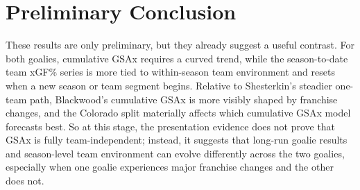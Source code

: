\documentclass[
  10pt,
]{extarticle}
\begin{document}
\section{Preliminary Conclusion}\label{preliminary-conclusion}

These results are only preliminary, but they already suggest a useful contrast. For both goalies, cumulative GSAx requires a curved trend, while the season-to-date team xGF\% series is more tied to within-season team environment and resets when a new season or team segment begins. Relative to Shesterkin's steadier one-team path, Blackwood's cumulative GSAx is more visibly shaped by franchise changes, and the Colorado split materially affects which cumulative GSAx model forecasts best. So at this stage, the presentation evidence does not prove that GSAx is fully team-independent; instead, it suggests that long-run goalie results and season-level team environment can evolve differently across the two goalies, especially when one goalie experiences major franchise changes and the other does not.
\end{document}
